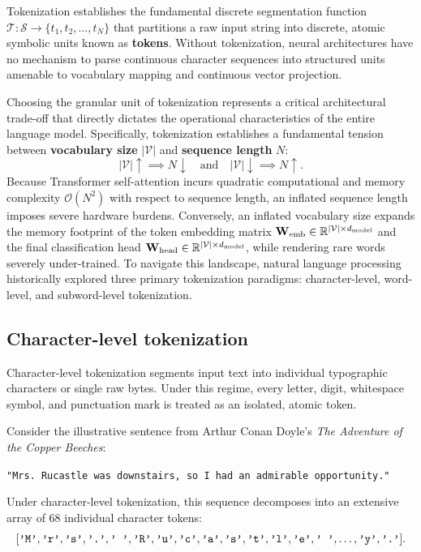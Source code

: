 \documentclass[../../main.tex]{subfiles}
\begin{document}
Tokenization establishes the fundamental discrete segmentation function $\mathcal{T}: \mathcal{S} \to \{t_1, t_2, \dots, t_N\}$ that partitions a raw input string into discrete, atomic symbolic units known as \textbf{tokens}. Without tokenization, neural architectures have no mechanism to parse continuous character sequences into structured units amenable to vocabulary mapping and continuous vector projection.

Choosing the granular unit of tokenization represents a critical architectural trade-off that directly dictates the operational characteristics of the entire language model. Specifically, tokenization establishes a fundamental tension between \textbf{vocabulary size} $|\mathcal{V}|$ and \textbf{sequence length} $N$:
\begin{equation}
\label{eq:tokenization_tradeoff}
|\mathcal{V}| \uparrow \implies N \downarrow \quad \text{and} \quad |\mathcal{V}| \downarrow \implies N \uparrow.
\end{equation}
Because Transformer self-attention incurs quadratic computational and memory complexity $\mathcal{O}(N^2)$ with respect to sequence length, an inflated sequence length imposes severe hardware burdens. Conversely, an inflated vocabulary size expands the memory footprint of the token embedding matrix $\mathbf{W}_{\text{emb}} \in \mathbb{R}^{|\mathcal{V}| \times d_{\text{model}}}$ and the final classification head $\mathbf{W}_{\text{head}} \in \mathbb{R}^{|\mathcal{V}| \times d_{\text{model}}}$, while rendering rare words severely under-trained. To navigate this landscape, natural language processing historically explored three primary tokenization paradigms: character-level, word-level, and subword-level tokenization.

\subsection{Character-level tokenization}
\label{subsec:character_level_tokenization}

Character-level tokenization segments input text into individual typographic characters or single raw bytes. Under this regime, every letter, digit, whitespace symbol, and punctuation mark is treated as an isolated, atomic token.

Consider the illustrative sentence from Arthur Conan Doyle's \emph{The Adventure of the Copper Beeches}:
\begin{center}
\texttt{"Mrs. Rucastle was downstairs, so I had an admirable opportunity."}
\end{center}
Under character-level tokenization, this sequence decomposes into an extensive array of 68 individual character tokens:
\begin{equation}
\label{eq:char_token_example}
[\text{\texttt{'M'}}, \text{\texttt{'r'}}, \text{\texttt{'s'}}, \text{\texttt{'.'}}, \text{\texttt{' '}}, \text{\texttt{'R'}}, \text{\texttt{'u'}}, \text{\texttt{'c'}}, \text{\texttt{'a'}}, \text{\texttt{'s'}}, \text{\texttt{'t'}}, \text{\texttt{'l'}}, \text{\texttt{'e'}}, \text{\texttt{' '}}, \dots, \text{\texttt{'y'}}, \text{\texttt{'.'}}].
\end{equation}
\end{document}

